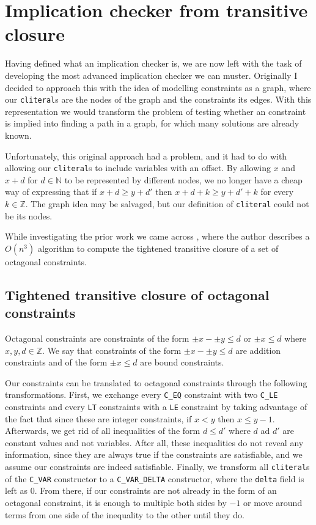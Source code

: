 \chapter{Implication checker from transitive closure}
\label{cap:basic-definitions}

Having defined what an implication checker is, we are now left with the task of
developing the most advanced implication checker we can muster. Originally I
decided to approach this with the idea of modelling constraints as a graph, where
our \texttt{cliteral}s are the nodes of the graph and the constraints its edges. With 
this representation we would transform the problem of testing whether an constraint is
implied into finding a path in a graph, for which many solutions are already 
known.

Unfortunately, this original approach had a problem, and it had to do with 
allowing our \texttt{cliteral}s to include variables with an offset.
By allowing $x$ and $x + d$ for $d \in \mathbb{N}$ to be represented by 
different nodes, we no longer have a cheap way of expressing that if $x + d \ge y + d'$ then $x + d + k \ge y + d' + k$ for every $k\in \mathbb{Z}$. The graph
idea may be salvaged, but our definition of \texttt{cliteral} could not be
its nodes.

While investigating the prior work we came across \cite{TransitiveClosure}, where
the author describes a $O(n^3)$ algorithm to compute the tightened transitive 
closure of a set of octagonal constraints.

\section{Tightened transitive closure of octagonal constraints}

Octagonal constraints are constraints of the form $\pm x - \pm y \le d$ or 
$\pm x \le d$ where $x,y,d \in \mathbb{Z}$. We say that constraints of the form
$\pm x - \pm y \le d$ are addition constraints and of the form $\pm x \le d$ are
bound constraints.

Our constraints can be translated to octagonal constraints through the following 
transformations. First, we exchange every \texttt{C_EQ} constraint with two
\texttt{C_LE} constraints and every \texttt{LT} constraints with a 
\texttt{LE} constraint by taking advantage of the fact that since these are 
integer constraints, if $x < y$ then $x \le y-1$. Afterwards, we get rid of all 
inequalities of the form $d \le d'$ where $d$ ad $d'$ are constant values and not
variables. After all, these inequalities do not reveal any information, since they
are always true if the constraints are satisfiable, and we assume our constraints
are indeed satisfiable. Finally, we transform all \texttt{cliteral}s of the
\texttt{C_VAR} constructor to a \texttt{C_VAR_DELTA} constructor, where
the \texttt{delta} field is left as 0. From there, if our constraints are not
already in the form of an octagonal constraint, it is enough to multiple both sides
by $-1$ or move around terms from one side of the inequality to the other until 
they do.

